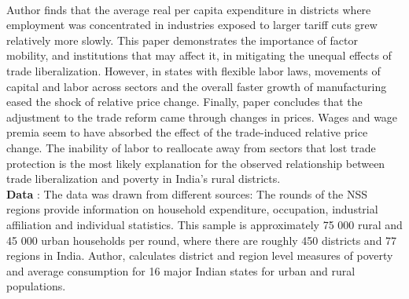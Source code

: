 \documentclass[a4paper,12pt]{article}
\begin{document}
\\ Author finds that the average real per capita expenditure in districts where employment was concentrated in industries exposed to larger tariff cuts grew relatively more slowly. 
This paper demonstrates the importance of factor mobility, and institutions that may affect it, in mitigating the unequal effects of trade liberalization. However, in states with flexible labor laws, movements of capital and labor across sectors and the overall faster growth of manufacturing eased the shock of relative price change. Finally, paper concludes that the adjustment to the trade reform came through changes in prices. Wages and wage premia seem to have absorbed the effect of the trade-induced relative price change. The inability of labor to reallocate away from sectors that lost trade protection is the most likely explanation for the observed relationship between trade liberalization and poverty in India's rural districts.  
\\ \textbf{Data} : The data was drawn from different sources: The rounds of the NSS regions provide information on household expenditure, occupation, industrial affiliation and individual statistics. This sample is approximately 75 000 rural and 45 000 urban households per round, where there are roughly 450 districts and 77 regions in India. Author, calculates district and region level measures of poverty and average consumption for 16 major Indian states for urban and rural populations.   
\end{document}
